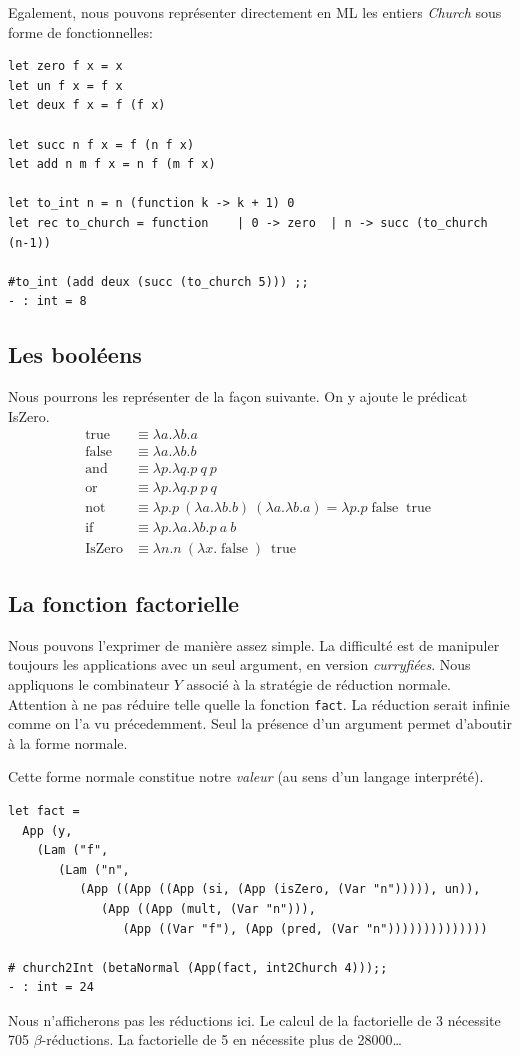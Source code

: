 \documentclass[11pt]{book}
\begin{document}
Egalement, nous pouvons représenter directement en ML les entiers \textit{Church} sous forme de fonctionnelles:
\begin{Verbatim}
let zero f x = x
let un f x = f x
let deux f x = f (f x)

let succ n f x = f (n f x)
let add n m f x = n f (m f x)

let to_int n = n (function k -> k + 1) 0
let rec to_church = function	| 0 -> zero  | n -> succ (to_church (n-1))
	
#to_int (add deux (succ (to_church 5))) ;;
- : int = 8	
\end{Verbatim}

\subsection{Les booléens }
Nous pourrons les représenter de la façon suivante. On y ajoute le prédicat IsZero.
$$
\begin{array}{ll}
\operatorname {true} &\equiv \lambda a.\lambda b.a \\
\operatorname {false} &\equiv \lambda a.\lambda b.b \\
\operatorname {and} &\equiv \lambda p.\lambda q.p\ q\ p\\
\operatorname {or} &\equiv \lambda p.\lambda q.p\ p\ q\\
\operatorname {not} &\equiv \lambda p.p\ (\lambda a.\lambda b.b)\ (\lambda a.\lambda b.a)=\lambda p.p\operatorname {false} \operatorname {true} \\
\operatorname {if} &\equiv \lambda p.\lambda a.\lambda b.p\ a\ b  \\
\operatorname{IsZero} &\equiv  \lambda n.n\ (\lambda x.\operatorname{false})\ \operatorname{true}
\end{array}
$$

\subsection{La fonction factorielle}
Nous pouvons l'exprimer de manière assez simple. La difficulté est de manipuler toujours les applications avec un seul argument, en version
\textit{curryfiées}.
Nous appliquons le combinateur $Y$ associé à la stratégie de réduction normale.
Attention à ne pas réduire telle quelle la fonction \verb+fact+. La réduction serait infinie comme on l'a vu précedemment. Seul la présence
d'un argument permet d'aboutir à la forme normale.

Cette forme normale constitue notre \textit{valeur} (au sens d'un langage interprété).
\begin{Verbatim}
let fact =
  App (y,
    (Lam ("f",
       (Lam ("n",
          (App ((App ((App (si, (App (isZero, (Var "n"))))), un)),
             (App ((App (mult, (Var "n"))),
                (App ((Var "f"), (App (pred, (Var "n"))))))))))))))

# church2Int (betaNormal (App(fact, int2Church 4)));;
- : int = 24																																							 
\end{Verbatim}
Nous n'afficherons pas les réductions ici. Le calcul de la factorielle de 3 nécessite 705 $\beta$-réductions. 
La factorielle de 5 en nécessite plus de 28000\ldots
\end{document}
